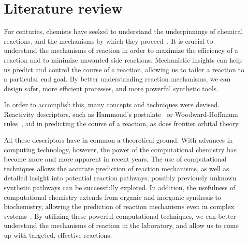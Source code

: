 \chapter{Literature review}%
\label{ch:lit-review}

For centuries, chemists have seeked to understand the underpinnings of chemical reactions,
and the mechanisms by which they proceed~\cite{Armstrong_1887}.
It is crucial to understand the mechanisms of reaction in order to maximize the efficiency of a reaction
and to minimize unwanted side reactions.
Mechanistic insights can help us predict and control the course of a reaction, allowing us to tailor a reaction to a particular end goal.
By better understanding reaction mechanisms, we can design safer, more efficient processes, and more powerful synthetic tools.

In order to accomplish this, many concepts and techniques were devised.
Reactivity descriptors, such as
Hammond's postulate~\cite{Hammond_1955,Cremer_2012,HammondPrinciple} or
Woodward-Hoffmann rules~\cite{Havinga_1961,Woodward_1965,Dewar_1966,Zimmerman_1966,Woodward_1969,Nobel_1981},
aid in predicting the course of a reaction, as does frontier orbital theory~\cite{Fukui_1952,Brown_2013}.

All these descriptors have in common a theoretical ground.
With advances in computing technology, however, the power of the computational chemistry has become more and more apparent in recent years.
The use of computational techniques allows the accurate prediction of reaction mechanisms,
as well as detailed insight into potential reaction pathways;
possibly previously unknown synthetic pathways can be successfully explored.
In addition, the usefulness of computational chemistry extends from organic and inorganic synthesis to biochemistry,
allowing the prediction of reaction mechanisms even in complex systems~\cite{Klippenstein_2014}.
By utilizing these powerful computational techniques, we can better understand the mechanisms of reaction in the laboratory,
and allow us to come up with targeted, effective reactions.
